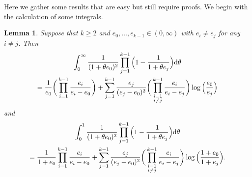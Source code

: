 \documentclass{article}
\theoremstyle{plain}
\newtheorem{lem}[thm]{Lemma}
\theoremstyle{definition}
\renewcommand{\d}{{\rm{d}}}
\begin{document}
Here we gather some results that are easy but still require proofs. We begin with the calculation of some integrals.



\begin{lem}\label{partialfrac2}
Suppose that $k\ge 2$ and $e_0,\ldots,e_{k-1}\in(0,\infty)$ with $e_i\neq e_j$ for any $i\neq j$. Then
\begin{multline*}
\int_0^\infty \frac{1}{(1+\theta e_0)^2} \prod_{j=1}^{k-1} \Big(1-\frac{1}{1+\theta e_j}\Big)\d \theta\\
=\frac{1}{e_0}\bigg(\prod_{i=1}^{k-1} \frac{e_i}{e_i-e_0}\bigg) + \sum_{j=1}^{k-1} \frac{e_j}{(e_j-e_0)^2}\bigg(\prod_{\substack{i=1\\ i\neq j}}^{k-1} \frac{e_i}{e_i-e_j}\bigg)\log\Big(\frac{e_0}{e_j}\Big)
\end{multline*}
and
\begin{multline*}
\int_0^1 \frac{1}{(1+\theta e_0)^2} \prod_{j=1}^{k-1} \Big(1-\frac{1}{1+\theta e_j}\Big)\d \theta\\
= \frac{1}{1+e_0}\prod_{i=1}^{k-1}\frac{e_i}{e_i-e_0} + \sum_{j=1}^{k-1} \frac{e_j}{(e_j-e_0)^2}\bigg(\prod_{\substack{i=1\\ i\neq j}}^{k-1} \frac{e_i}{e_i-e_j}\bigg)\log\Big(\frac{1+e_0}{1+e_j}\Big).
\end{multline*}
\end{lem}
\end{document}
